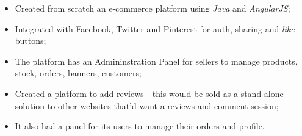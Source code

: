 \begin{experiences}
{          \begin{itemize}
            \item Created from scratch an e-commerce platform using \emph{Java} and \emph{AngularJS};
            \item Integrated with Facebook, Twitter and Pinterest for auth, sharing and \emph{like} buttons;
            \item The platform has an Admininstration Panel for sellers to manage products, stock, orders, banners, customers; 
            \item Created a platform to add reviews - this would be sold as a stand-alone solution to other websites that'd want a reviews and comment session;
            \item It also had a panel for its users to manage their orders and profile.\\ 
          \end{itemize}
        }{}
\end{experiences}
